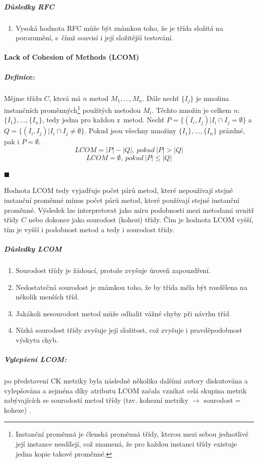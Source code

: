 \documentclass[11pt,twoside,a4paper]{book}
\begin{document}
\subparagraph{Důsledky RFC}
\begin{enumerate}
\item Vysoká hodnota RFC může být známkou toho, že je třída složitá na porozumění, s~čímž souvisí i její složitější testování.
\end{enumerate}

\paragraph{Lack of Cohesion of Methods (LCOM)}
\label{sec:LCOM}
\subparagraph{Definice:} Mějme třídu $C$, která má $n$ metod $M_1, ..., M_n$.
Dále nechť $\{I_j\}$ je množina {instančních proměnných}\footnote{Instanční proměnná je členská
proměnná třídy, kterou mezi sebou jednotlivé její instance nesdílejí, což znamená, že pro každou instanci třídy
existuje jedna kopie takové proměnné.} použitých metodou $M_i$. Těchto množin je celkem $n$: $\{I_1\}, ..., \{I_n\}$,
tedy jedna pro každou z~metod. Nechť $P = \{(I_i, I_j)|I_i \cap I_j = \emptyset\}$ a
$Q = \{(I_i, I_j)|I_i \cap I_j \neq \emptyset\}$. Pokud jsou všechny množiny $\{I_1\}, ..., \{I_n\}$ prázdné,
pak i $P = \emptyset$.
$$LCOM = |P| - |Q|,\ pokud\ |P| > |Q|$$
$$LCOM = \emptyset,\ pokud\ |P| \leq |Q|$$
\begin{flushright}$\blacksquare$\end{flushright}

Hodnota LCOM tedy vyjadřuje počet párů metod, které nepoužívají stejné instanční proměnné mínus
počet párů metod, které používají stejné instanční proměnné. Výsledek lze interpretovat jako
míru podobnosti mezi metodami uvnitř třídy $C$ nebo dokonce jako sourodost (kohezi) třídy.
Čím je hodnota LCOM vyšší, tím je vyšší i podobnost metod a tedy i sourodost třídy.

\subparagraph{Důsledky LCOM}
\begin{enumerate}
\item Sourodost třídy je žádoucí, protože zvyšuje úroveň zapouzdření.
\item Nedostatečná sourodost je známkou toho, že by třída měla být rozdělena na několik menších tříd.
\item Jakákoli nesourodost metod může odhalit vážné chyby při návrhu tříd.
\item Nízká sourodost třídy zvyšuje její složitost, což zvyšuje i pravděpodobnost výskytu chyb.
\end{enumerate}

\subparagraph{Vylepšení LCOM:} po představení CK metriky byla následně několika dalšími autory diskutována a vylepšována
a zejména díky atributu LCOM začala vznikat celá skupina metrik zabývajících se sourodostí metod třídy
(tzv. kohezní metriky $\rightarrow$ sourodost = koheze) \cite{KOHEZE1_MARTIN,KOHEZE2,KOHEZE3}.
\end{document}
